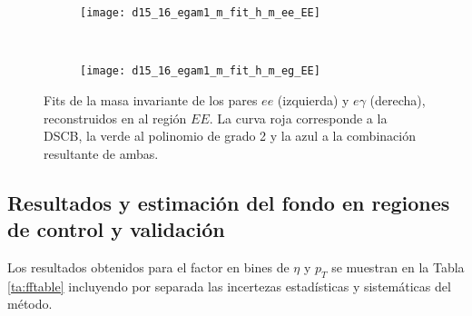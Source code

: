 \begin{figure}

	\begin{subfigure}{0.5\textwidth}
		\texttt{[image: d15\_16\_egam1\_m\_fit\_h\_m\_ee\_EE]} 
	\end{subfigure}
	~
	\begin{subfigure}{0.5\textwidth}
		\texttt{[image: d15\_16\_egam1\_m\_fit\_h\_m\_eg\_EE]}
	\end{subfigure}

	
	\caption{Fits de la masa invariante de los pares $ee$ (izquierda) y $e\gamma$ (derecha), reconstruidos en al región $EE$. La curva roja corresponde a la DSCB, la verde al polinomio de grado 2 y la azul a la combinación resultante de ambas.}
\label{fits_EE}
\end{figure}


\subsection{Resultados y estimación del fondo en regiones de control y validación} \label{sec:resultados}


Los resultados obtenidos para el factor en bines de $\eta$ y $p_{T}$ se muestran en la Tabla \ref{ta:fftable} incluyendo por separada las incertezas estadísticas y sistemáticas del método.


